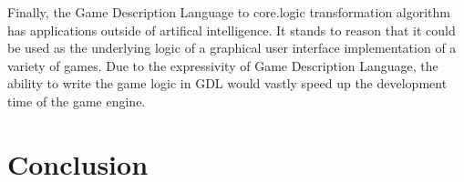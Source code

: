 \documentclass[letterpaper]{article}
\begin{document}
Finally, the Game Description Language to core.logic transformation algorithm has applications outside of artifical intelligence. It stands to reason that it could be used as the underlying logic of a graphical user interface implementation of a variety of games. Due to the expressivity of Game Description Language, the ability to write the game logic in GDL would vastly speed up the development time of the game engine.

\section{Conclusion}



\end{document}
